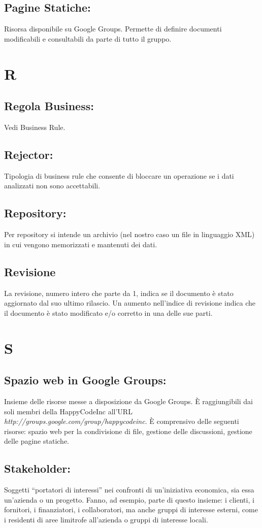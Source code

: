 \documentclass[11pt,titlepage,a4paper]{report}
\begin{document}
\section{Pagine Statiche:}
Risorsa disponibile su Google Groups. Permette di definire documenti modificabili e consultabili da parte di tutto il gruppo.

\chapter{R}
\section{Regola Business:}
Vedi Business Rule.
\section{Rejector:}
Tipologia di business rule che consente di bloccare un operazione se i dati analizzati non sono accettabili.
\section{Repository:} 
Per repository si intende un archivio (nel nostro caso un file in linguaggio XML) in cui vengono memorizzati e mantenuti dei dati.
\section{Revisione}
La revisione, numero intero che parte da 1, indica se il documento \`e stato aggiornato dal suo ultimo rilascio. Un aumento nell'indice di revisione indica che il documento \`e stato modificato e/o corretto in una delle sue parti.

\chapter{S}
\section{Spazio web in Google Groups:}
Insieme delle risorse messe a disposizione da Google Groups. \`E raggiungibili dai soli membri della HappyCodeInc all'URL\\ \textit{http://groups.google.com/group/happycodeinc}. \`E comprensivo delle seguenti risorse: spazio web per la condivisione di file, gestione delle discussioni, gestione delle pagine statiche.
\section{Stakeholder:}
Soggetti ``portatori di interessi'' nei confronti di un'iniziativa economica, sia essa un'azienda o un progetto. Fanno, ad esempio, parte di questo insieme: i clienti, i fornitori, i finanziatori, i collaboratori, ma anche gruppi di interesse esterni, come i residenti di aree limitrofe all'azienda o gruppi di interesse locali.
\end{document}
